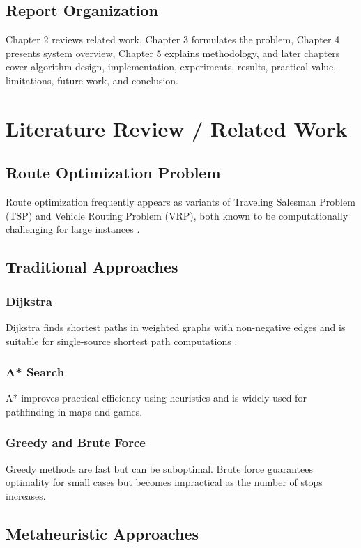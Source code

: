 \documentclass[12pt,a4paper]{report}
\begin{document}
\section{Report Organization}
Chapter 2 reviews related work, Chapter 3 formulates the problem, Chapter 4 presents system overview, Chapter 5 explains methodology, and later chapters cover algorithm design, implementation, experiments, results, practical value, limitations, future work, and conclusion.

\chapter{Literature Review / Related Work}

\section{Route Optimization Problem}
Route optimization frequently appears as variants of Traveling Salesman Problem (TSP) and Vehicle Routing Problem (VRP), both known to be computationally challenging for large instances \cite{dantzig1959}.

\section{Traditional Approaches}
\subsection{Dijkstra}
Dijkstra finds shortest paths in weighted graphs with non-negative edges and is suitable for single-source shortest path computations \cite{cormen2009}.

\subsection{A* Search}
A* improves practical efficiency using heuristics and is widely used for pathfinding in maps and games.

\subsection{Greedy and Brute Force}
Greedy methods are fast but can be suboptimal. Brute force guarantees optimality for small cases but becomes impractical as the number of stops increases.

\section{Metaheuristic Approaches}
\end{document}
